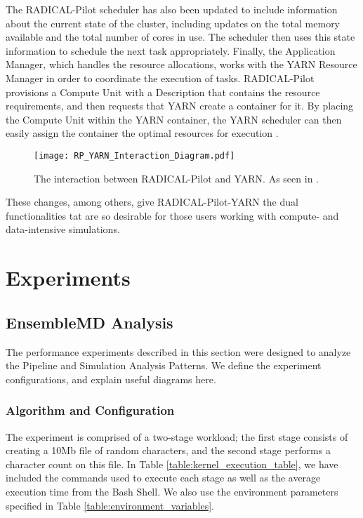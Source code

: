 \documentclass[]{article}
\begin{document}
		The RADICAL-Pilot scheduler has also been updated to include information about the current state of the cluster, including updates on the total memory available and the total number of cores in use. The scheduler then uses this state information to schedule the next task appropriately. Finally, the Application Manager, which handles the resource allocations, works with the YARN Resource Manager in order to coordinate the execution of tasks. RADICAL-Pilot provisions a Compute Unit with a Description that contains the resource requirements, and then requests that YARN create a container for it. By placing the Compute Unit within the YARN container, the YARN scheduler can then easily assign the container the optimal resources for execution \cite{hadoop_paper}. 

		\begin{figure}[H]
			\centering
			\texttt{[image: RP\_YARN\_Interaction\_Diagram.pdf]}
			\caption{The interaction between RADICAL-Pilot and YARN. As seen in \cite{hadoop_paper}.}
			\label{fig:rp_yarn_interaction}
		\end{figure}

		These changes, among others, give RADICAL-Pilot-YARN the dual functionalities tat are so desirable for those users working with compute- and data-intensive simulations. 

\section{Experiments}

	\subsection{EnsembleMD Analysis}
		The performance experiments described in this section were designed to analyze the Pipeline and Simulation Analysis Patterns. We define the experiment configurations, and explain useful diagrams here.

		\subsubsection{Algorithm and Configuration}
			The experiment is comprised of a two-stage workload; the first stage consists of creating a 10Mb file of random characters, and the second stage performs a character count on this file. In Table \ref{table:kernel_execution_table}, we have included the commands used to execute each stage as well as the average execution time from the Bash Shell. We also use the environment parameters specified in Table \ref{table:environment_variables}.
\end{document}
